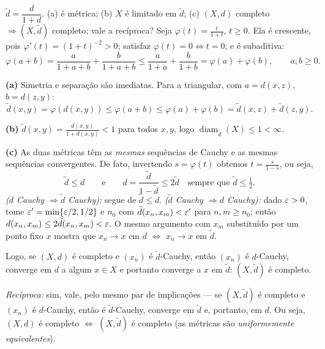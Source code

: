 \begin{exercicio}{$\widetilde{d}=\dfrac{d}{1+d}$. (a) é métrica; (b) $X$ é limitado em $\widetilde d$; (c) $(X,d)$ completo $\Rightarrow(X,\widetilde d)$ completo; vale a recíproca?}
\sol
Seja $\varphi(t)=\frac{t}{1+t}$, $t\ge0$. Ela é crescente, pois $\varphi'(t)=(1+t)^{-2}>0$; satisfaz $\varphi(t)=0\iff t=0$; e é subaditiva:
\[ \varphi(a+b)=\frac{a}{1+a+b}+\frac{b}{1+a+b}\le\frac{a}{1+a}+\frac{b}{1+b}=\varphi(a)+\varphi(b),\qquad a,b\ge0. \]

\textbf{(a)} Simetria e separação são imediatas. Para a triangular, com $a=d(x,z)$, $b=d(z,y)$:
\[ \widetilde d(x,y)=\varphi(d(x,y))\le\varphi(a+b)\le\varphi(a)+\varphi(b)=\widetilde d(x,z)+\widetilde d(z,y). \]

\textbf{(b)} $\widetilde d(x,y)=\frac{d(x,y)}{1+d(x,y)}<1$ para todos $x,y$, logo $\operatorname{diam}_{\widetilde d}(X)\le1<\infty$.

\textbf{(c)} As duas métricas têm as \emph{mesmas} sequências de Cauchy e as mesmas sequências convergentes. De fato, invertendo $s=\varphi(t)$ obtemos $t=\frac{s}{1-s}$, ou seja,
\[ \widetilde d\le d \qquad\text{e}\qquad d=\frac{\widetilde d}{1-\widetilde d}\le 2\widetilde d \quad\text{sempre que } \widetilde d\le\tfrac12. \]
\emph{($d$ Cauchy $\Rightarrow \widetilde d$ Cauchy):} segue de $\widetilde d\le d$. \emph{($\widetilde d$ Cauchy $\Rightarrow d$ Cauchy):} dado $\varepsilon>0$, tome $\varepsilon'=\min\{\varepsilon/2,1/2\}$ e $n_0$ com $\widetilde d(x_n,x_m)<\varepsilon'$ para $n,m\ge n_0$; então $d(x_n,x_m)\le2\widetilde d(x_n,x_m)<\varepsilon$. O mesmo argumento com $x_m$ substituído por um ponto fixo $x$ mostra que $x_n\to x$ em $d$ $\iff$ $x_n\to x$ em $\widetilde d$.

Logo, se $(X,d)$ é completo e $(x_n)$ é $\widetilde d$-Cauchy, então $(x_n)$ é $d$-Cauchy, converge em $d$ a algum $x\in X$ e portanto converge a $x$ em $\widetilde d$: $(X,\widetilde d)$ é completo.

\emph{Recíproca:} sim, vale, pelo mesmo par de implicações --- se $(X,\widetilde d)$ é completo e $(x_n)$ é $d$-Cauchy, então é $\widetilde d$-Cauchy, converge em $\widetilde d$ e, portanto, em $d$. Ou seja, $(X,d)$ é completo $\iff$ $(X,\widetilde d)$ é completo (as métricas são \emph{uniformemente equivalentes}).
\end{exercicio}
